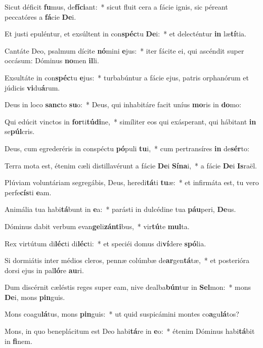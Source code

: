 \item Sicut déficit \textbf{fu}mus, de\textbf{fí}\textbf{ci}ant:~* sicut fluit cera a fácie ignis, sic péreant peccatóres a \textbf{fá}cie \textbf{De}i.
\item Et justi epuléntur, et exsúltent in con\textbf{spéc}tu \textbf{De}i:~* et delecténtur \textbf{in} læ\textbf{tí}tia.
\item Cantáte Deo, psalmum dícite \textbf{nó}mini \textbf{e}jus:~* iter fácite ei, qui ascéndit super occásum: Dóminus \textbf{no}men \textbf{il}li.
\item Exsultáte in con\textbf{spéc}tu \textbf{e}jus:~* turbabúntur a fácie ejus, patris orphanórum et júdicis \textbf{vi}du\textbf{á}rum.
\item Deus in loco \textbf{sanc}to \textbf{su}o:~* Deus, qui inhabitáre facit uníus \textbf{mo}ris in \textbf{do}mo:
\item Qui edúcit vinctos in \textbf{for}ti\textbf{tú}\textbf{di}ne,~* simíliter eos qui exásperant, qui hábitant \textbf{in} se\textbf{púl}cris.
\item Deus, cum egrederéris in conspéctu \textbf{pó}puli \textbf{tu}i,~* cum pertransíres \textbf{in} de\textbf{sér}to:
\item Terra mota est, étenim cæli distillavérunt a fácie \textbf{De}i \textbf{Sí}\textbf{na}i,~* a fácie \textbf{De}i \textbf{Is}raël.
\item Plúviam voluntáriam segregábis, Deus, heredi\textbf{tá}ti \textbf{tu}æ:~* et infirmáta est, tu vero perfe\textbf{cís}ti \textbf{e}am.
\item Animália tua habi\textbf{tá}bunt in \textbf{e}a:~* parásti in dulcédine tua \textbf{páu}peri, \textbf{De}us.
\item Dóminus dabit verbum evan\textbf{ge}li\textbf{zán}\textbf{ti}bus,~* vir\textbf{tú}te \textbf{mul}ta.
\item Rex virtútum di\textbf{léc}ti di\textbf{léc}ti:~* et speciéi domus di\textbf{ví}dere \textbf{spó}lia.
\item Si dormiátis inter médios cleros, pennæ colúmbæ de\textbf{ar}gen\textbf{tá}tæ,~* et posterióra dorsi ejus in pal\textbf{ló}re \textbf{au}ri.
\item Dum discérnit cæléstis reges super eam, nive dealba\textbf{bún}tur in \textbf{Sel}mon:~* mons \textbf{De}i, mons \textbf{pin}guis.
\item Mons coagu\textbf{lá}tus, mons \textbf{pin}guis:~* ut quid suspicámini montes co\textbf{a}gu\textbf{lá}tos?
\item Mons, in quo beneplácitum est Deo habi\textbf{tá}re in \textbf{e}o:~* étenim Dóminus habi\textbf{tá}bit in \textbf{fi}nem.
